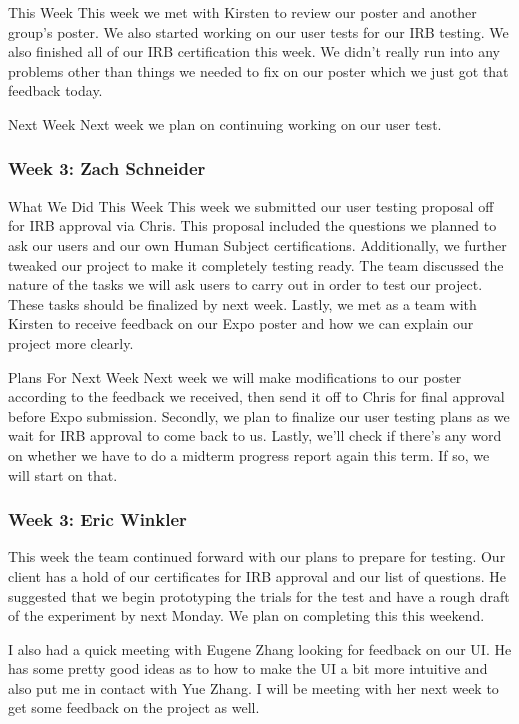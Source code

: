 This Week
This week we met with Kirsten to review our poster and another group's poster. We also started working on our user tests for our IRB testing. We also finished all of our IRB certification this week. We didn't really run into any problems other than things we needed to fix on our poster which we just got that feedback today. 

Next Week
Next week we plan on continuing working on our user test.

\subsubsection{Week 3: Zach Schneider}

What We Did This Week
This week we submitted our user testing proposal off for IRB approval via Chris. This proposal included the questions we planned to ask our users and our own Human Subject certifications. Additionally, we further tweaked our project to make it completely testing ready. The team discussed the nature of the tasks we will ask users to carry out in order to test our project. These tasks should be finalized by next week. Lastly, we met as a team with Kirsten to receive feedback on our Expo poster and how we can explain our project more clearly.

Plans For Next Week
Next week we will make modifications to our poster according to the feedback we received, then send it off to Chris for final approval before Expo submission. Secondly, we plan to finalize our user testing plans as we wait for IRB approval to come back to us. Lastly, we'll check if there's any word on whether we have to do a midterm progress report again this term. If so, we will start on that.

\subsubsection{Week 3: Eric Winkler}

This week the team continued forward with our plans to prepare for testing. Our client has a hold of our certificates for IRB approval and our list of questions. He suggested that we begin prototyping the trials for the test and have a rough draft of the experiment by next Monday. We plan on completing this this weekend. 

I also had a quick meeting with Eugene Zhang looking for feedback on our UI. He has some pretty good ideas as to how to make the UI a bit more intuitive and also put me in contact with Yue Zhang. I will be meeting with her next week to get some feedback on the project as well.

